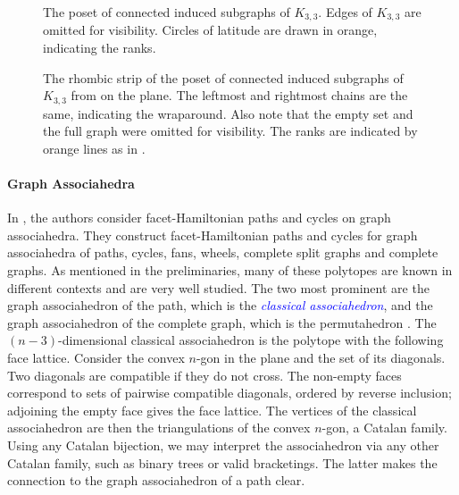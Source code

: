 \documentclass[fontsize=11pt,a4paper,DIV=12]{scrartcl}
\newcommand{\defn}[1]{\textsl{\textcolor{Blue}{#1}}}
\begin{document}
\begin{figure}
	\centering
	
	\caption{The poset of connected induced subgraphs of $K_{3,3}$. Edges of $K_{3,3}$ are omitted for visibility. Circles of latitude are drawn in orange, indicating the ranks.}
	\label{fig:K33 on sphere}
\end{figure}

\begin{figure}
	\centering
	\makebox[\textwidth][c]{}
	\caption{The rhombic strip of the poset of connected induced subgraphs of $K_{3,3}$ from  on the plane. The leftmost and rightmost chains are the same, indicating the wraparound. Also note that the empty set and the full graph were omitted for visibility. The ranks are indicated by orange lines as in .}
	\label{fig:K33 on plane}
\end{figure}

\paragraph{Graph Associahedra}
In \cite{facethamiltonicity}, the authors consider facet-Hamiltonian paths and cycles on graph associahedra. They construct facet-Hamiltonian paths and cycles for graph associahedra of paths, cycles, fans, wheels, complete split graphs and complete graphs. As mentioned in the preliminaries, many of these polytopes are known in different contexts and are very well studied. The two most prominent are the graph associahedron of the path, which is the \defn{classical associahedron}, and the graph associahedron of the complete graph, which is the permutahedron \cite{Associahedron, Associahedra_spines, Associahedra_diameter, Associahedron_realizations, Associahedron_non_leaving_face}. The $(n-3)$-dimensional classical associahedron is the polytope with the following face lattice. Consider the convex $n$-gon in the plane and the set of its diagonals. Two diagonals are compatible if they do not cross. The non-empty faces correspond to sets of pairwise compatible diagonals, ordered by reverse inclusion; adjoining the empty face gives the face lattice. The vertices of the classical associahedron are then the triangulations of the convex $n$-gon, a Catalan family. Using any Catalan bijection, we may interpret the associahedron via any other Catalan family, such as binary trees or valid bracketings. The latter makes the connection to the graph associahedron of a path clear.
\end{document}
